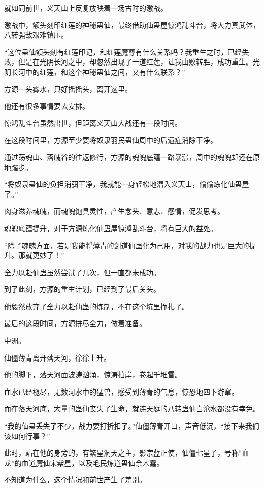 \begin{this_body}
就如同前世，义天山上反复放映着一场古时的激战。

激战中，额头刻印红莲的神秘蛊仙，最终借助仙蛊屋惊鸿乱斗台，将大力真武体，八转强敌艰难镇压。

“这位蛊仙额头刻有红莲印记，和红莲魔尊有什么关系吗？我重生之时，已经失败，但是在光阴长河之中，却忽然出现了一道红莲，让我由败转胜，成功重生。光阴长河中的红莲，和这个神秘蛊仙之间，又有什么联系？”

方源一头雾水，只好摇摇头，离开这里。

他还有很多事情要去安排。

惊鸿乱斗台虽然出世，但距离义天山大战还有一段时间。

在这段时间里，方源至少要将奴隶羽民蛊仙周中的后遗症消除干净。

通过荡魂山、落魄谷的往返修行，方源的魂魄底蕴一路暴涨，周中的魂魄却还在原地踏步。

“将奴隶蛊仙的负担消弭干净，我就能一身轻松地潜入义天山，偷偷炼化仙蛊屋了。”

肉身滋养魂魄，而魂魄饱具灵性，产生念头、意志、感情，促发思考。

魂魄底蕴提升，对于方源炼化仙蛊屋惊鸿乱斗台，将有巨大的益处。

“除了魂魄方面，若是我能将薄青的剑道仙蛊化为己用，对我的战力也是巨大的提升。那就更妙了！”

全力以赴仙蛊虽然尝试了几次，但一直都未成功。

到了此刻，方源的重生计划，已经到了最后关头。

他毅然放弃了全力以赴仙蛊的炼制，不在这个坑里挣扎了。

最后的这段时间，方源拼尽全力，做着准备。

中洲。

仙僵薄青离开落天河，徐徐上升。

他的脚下，落天河面波涛汹涌，惊涛拍岸，卷起千堆雪。

血水已经褪尽，无数河水中的猛兽，感受到薄青的气息，惊恐地四下游窜。

而在落天河底，大量的蛊仙丧失了生命，就连天庭的八转蛊仙白沧水都没有幸免。

“我的仙蛊丢失了不少，战力要打折扣了。”仙僵薄青开口，声音低沉，“接下来我们该如何行事？”

此时，站在他的身旁的，有繁星洞天之主，影宗蓝正使，仙僵七星子，号称“血龙”的血道魔仙宋紫星，以及毛民炼道蛊仙余木蠢。

不知道为什么，这个情况和前世产生了差别。


\end{this_body}
